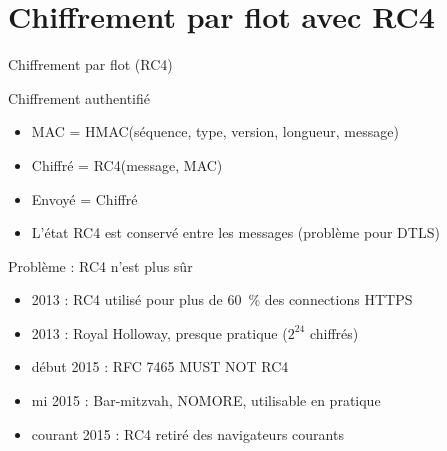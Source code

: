 \documentclass{mpg-ep-slides}
\begin{document}

\section[Flot]{Chiffrement par flot avec RC4}
\tocsect

\begin{frame}{Chiffrement par flot (RC4)}
  \begin{block}{Chiffrement authentifié}
    \begin{itemize}
      \item MAC = HMAC(\no séquence, type, version, longueur, message)
      \item Chiffré = RC4(message, MAC)
      \item Envoyé = Chiffré
      \item L'état RC4 est conservé entre les messages (problème pour DTLS)
    \end{itemize}
  \end{block}

  \begin{block}{Problème : RC4 n'est plus sûr}
    \begin{itemize}
      \item 2013 : RC4 utilisé pour plus de 60~\% des connections HTTPS
      \item 2013 : Royal Holloway, presque pratique ($2^{24}$ chiffrés)
      \item début 2015 : RFC 7465 MUST NOT RC4
      \item mi 2015 : Bar-mitzvah, NOMORE, utilisable en pratique
      \item courant 2015 : RC4 retiré des navigateurs courants
    \end{itemize}
  \end{block}
\end{frame}
\end{document}
